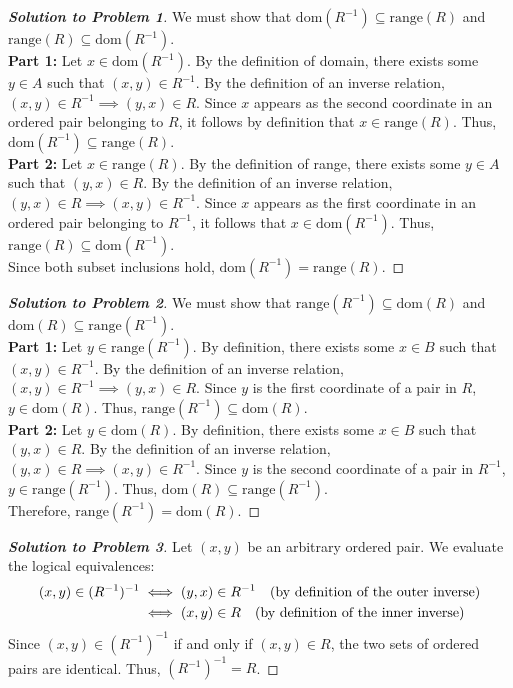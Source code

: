\documentclass[11pt, a4paper]{article}
\theoremstyle{definition}
\theoremstyle{remark}
\begin{document}
\begin{proof}[\textbf{Solution to Problem 1}]
We must show that $\mathrm{dom}(R^{-1}) \subseteq \mathrm{range}(R)$ and $\mathrm{range}(R) \subseteq \mathrm{dom}(R^{-1})$. \\
\textbf{Part 1:} Let $x \in \mathrm{dom}(R^{-1})$. By the definition of domain, there exists some $y \in A$ such that $(x, y) \in R^{-1}$. By the definition of an inverse relation, $(x, y) \in R^{-1} \implies (y, x) \in R$. Since $x$ appears as the second coordinate in an ordered pair belonging to $R$, it follows by definition that $x \in \mathrm{range}(R)$. Thus, $\mathrm{dom}(R^{-1}) \subseteq \mathrm{range}(R)$. \\
\textbf{Part 2:} Let $x \in \mathrm{range}(R)$. By the definition of range, there exists some $y \in A$ such that $(y, x) \in R$. By the definition of an inverse relation, $(y, x) \in R \implies (x, y) \in R^{-1}$. Since $x$ appears as the first coordinate in an ordered pair belonging to $R^{-1}$, it follows that $x \in \mathrm{dom}(R^{-1})$. Thus, $\mathrm{range}(R) \subseteq \mathrm{dom}(R^{-1})$. \\
Since both subset inclusions hold, $\mathrm{dom}(R^{-1}) = \mathrm{range}(R)$.
\end{proof}

\begin{proof}[\textbf{Solution to Problem 2}]
We must show that $\mathrm{range}(R^{-1}) \subseteq \mathrm{dom}(R)$ and $\mathrm{dom}(R) \subseteq \mathrm{range}(R^{-1})$. \\
\textbf{Part 1:} Let $y \in \mathrm{range}(R^{-1})$. By definition, there exists some $x \in B$ such that $(x, y) \in R^{-1}$. By the definition of an inverse relation, $(x, y) \in R^{-1} \implies (y, x) \in R$. Since $y$ is the first coordinate of a pair in $R$, $y \in \mathrm{dom}(R)$. Thus, $\mathrm{range}(R^{-1}) \subseteq \mathrm{dom}(R)$. \\
\textbf{Part 2:} Let $y \in \mathrm{dom}(R)$. By definition, there exists some $x \in B$ such that $(y, x) \in R$. By the definition of an inverse relation, $(y, x) \in R \implies (x, y) \in R^{-1}$. Since $y$ is the second coordinate of a pair in $R^{-1}$, $y \in \mathrm{range}(R^{-1})$. Thus, $\mathrm{dom}(R) \subseteq \mathrm{range}(R^{-1})$. \\
Therefore, $\mathrm{range}(R^{-1}) = \mathrm{dom}(R)$.
\end{proof}

\begin{proof}[\textbf{Solution to Problem 3}]
Let $(x, y)$ be an arbitrary ordered pair. We evaluate the logical equivalences:
\begin{align*}
(x, y) \in (R^{-1})^{-1} &\iff (y, x) \in R^{-1} \quad \text{(by definition of the outer inverse)} \\ \relax
&\iff (x, y) \in R \quad \text{(by definition of the inner inverse)}
\end{align*}
Since $(x, y) \in (R^{-1})^{-1}$ if and only if $(x, y) \in R$, the two sets of ordered pairs are identical. Thus, $(R^{-1})^{-1} = R$.
\end{proof}
\end{document}
